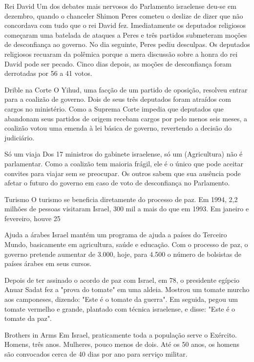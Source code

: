 Rei David 
Um dos debates mais nervosos do Parlamento israelense deu-se em dezembro, quando o chanceler Shimon Peres cometeu o deslize de dizer que não concordava com tudo que o rei David fez. Imediatamente os deputados religiosos começaram uma batelada de ataques a Peres e três partidos submeteram moções de desconfiança ao governo. No dia seguinte, Peres pediu desculpas. Os deputados religiosos recuaram da polêmica porque a mera discussão sobre a honra do rei David pode ser pecado. Cinco dias depois, as moções de desconfiança foram derrotadas por 56 a 41 votos.

Drible na Corte 
O Yihud, uma facção de um partido de oposição, resolveu entrar para a coalizão de governo. Dois de seus três deputados foram atraídos com cargos no ministério. Como a Suprema Corte impedia que deputados que abandonam seus partidos de origem recebam cargos por pelo menos seis meses, a coalizão votou uma emenda à lei básica de governo, revertendo a decisão do judiciário.

Só um viaja 
Dos 17 ministros do gabinete israelense, só um (Agricultura) não é parlamentar. Como a coalizão tem maioria frágil, ele é o único que pode aceitar convites para viajar sem se preocupar. Os outros sabem que sua ausência pode afetar o futuro do governo em caso de voto de desconfiança no Parlamento.

Turismo 
O turismo se beneficia diretamente do processo de paz. Em 1994, 2,2 milhões de pessoas visitaram Israel, 300 mil a mais do que em 1993. Em janeiro e fevereiro, houve 25%

Ajuda a árabes 
Israel mantém um programa de ajuda a países do Terceiro Mundo, basicamente em agricultura, saúde e educação. Com o processo de paz, o governo pretende aumentar de 3.000, hoje, para 4.500 o número de bolsistas de países árabes em seus cursos.

Depois de ter assinado o acordo de paz com Israel, em 78, o presidente egípcio Anuar Sadat fez a "prova do tomate" em uma aldeia. Mostrou um tomate murcho aos camponeses, dizendo: "Este é o tomate da guerra". Em seguida, pegou um tomate vermelho e grande, plantado com técnica israelense, e disse: "Este é o tomate da paz".

Brothers in Arms 
Em Israel, praticamente toda a população serve o Exército. Homens, três anos. Mulheres, pouco menos de dois. Até os 50 anos, os homens são convocados cerca de 40 dias por ano para serviço militar.

